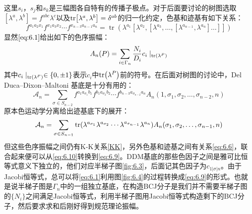 这里$s_i$，$s_j$和$s_k$是三幅图各自特有的传播子极点。对于后面要讨论的树图选取$[\lambda^a,\lambda^b] = f^{abc}\lambda^c$以及$\tr [\lambda^a,\lambda^b]=\delta^{ab}$的归一化约定，色基和迹基有如下关系：
\begin{equation}
	\label{eq:6.6}
	f^{a_1a_2x_1}f^{x_1a_3x_2}\cdots f^{x_{n-3}a_{n-1}a_n}=\operatorname{tr}\left(\lambda^{a_1}\left[\lambda^{a_2},[\lambda^{a_3},\ldots,[\lambda^{a_{n-1}},\lambda^{a_n}]\ldots]\right]\right)
\end{equation}
显然$\ref{eq:6.1}$给出如下的色序振幅：
\begin{equation}
	A_n(P)=\sum_{i\in\Gamma_n}\frac{N_i}{D_i}c_i\mid_{\tr (\lambda^P)}
\end{equation}
其中$c_i\mid_{\tr (\lambda^P)}\in\{0,\pm1\}$表示$c_i$中$\tr (\lambda^P)$前的符号。在后面对树图的讨论中，Del Duca–Dixon–Maltoni 基底是十分有用的\cite{DelDuca:1999rs}：
\begin{equation}
	\label{eq:6.9}
	\mathcal{A}_n = \sum_{\sigma \in S_{n-2}} f^{a_1 a_{\sigma_1} b_1} f^{b_1 a_{\sigma_2} b_2} \cdots f^{b_{n-3} a_{\sigma_{n-2}} a_n} A_n(1, \sigma_1, \sigma_2, \ldots, \sigma_{n-2}, n)
\end{equation}
原本色运动学分离给出迹基底下的展开：
\begin{equation}
	\label{eq:6.10}
	\mathcal{A}_n=\sum_{\sigma\in S_{n-1}}\tr (\lambda^{a_{\sigma_1}}\lambda^{a_{\sigma_2}}\cdots \lambda^{a_{\sigma_{n-1}}}\lambda^{a_n})A_n(\sigma_1,\sigma_2,\ldots,\sigma_{n-1},n)
\end{equation}
但这些色序振幅之间仍有K-K关系\ref{KK}，另外色基和迹基之间有关系\ref{eq:6.6}，联合起来便可以从\ref{eq:6.10}转换到\ref{eq:6.9}。DDM基底的那些色因子之间是雅可比恒等式意义下独立的，他们对应半梯子图\ref{fig:6.3}，后面记其色因子为$c_{1|\sigma|n}$。由于Jacobi恒等式，总可以将\ref{eq:6.1}利用图\ref{fig:6.4}的过程转换成\ref{eq:6.9}的形式。也就是说半梯子图是$\Gamma_n$中的一组独立基底，在构造BCJ分子是我们并不需要半梯子图的$\{N_i\}$之间满足Jacobi恒等式，利用半梯子图用Jacobi恒等式构造剩下的BCJ分子，然后要求求和后刚好得到规范理论振幅。

